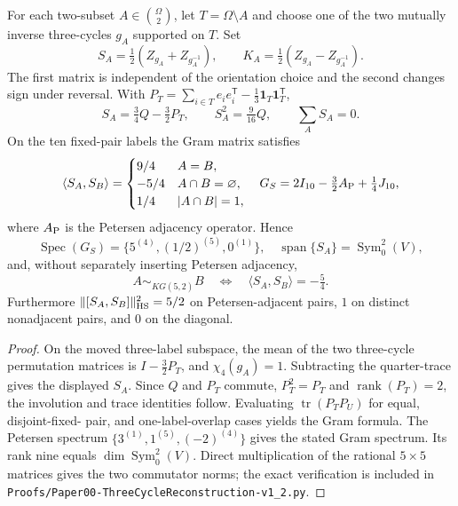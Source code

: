 \documentclass[11pt]{article}
\begin{document}
\begin{theorem}
\label{p1:thm:v342-three-cycle-petersen-overlap}
For each two-subset $A\in\binom\Omega2$, let $T=\Omega\setminus A$
and choose one of the two mutually inverse three-cycles $g_A$
supported on $T$.  Set
\[
 S_A=\tfrac12(Z_{g_A}+Z_{g_A^{-1}}),\qquad
 K_A=\tfrac12(Z_{g_A}-Z_{g_A^{-1}}).
\]
The first matrix is independent of the orientation choice and the
second changes sign under reversal.  With
$P_T=\sum_{i\in T}e_ie_i^{\mathsf T}
 -\tfrac13\mathbf1_T\mathbf1_T^{\mathsf T}$,
\[
 S_A=\tfrac34Q-\tfrac32P_T,\qquad
 S_A^2=\tfrac9{16}Q,\qquad
 \sum_AS_A=0.
\]
On the ten fixed-pair labels the Gram matrix satisfies
\[
 \langle S_A,S_B\rangle=
 \begin{cases}
 9/4&A=B,\\
 -5/4&A\cap B=\varnothing,\\
 1/4&|A\cap B|=1,
 \end{cases}
 \quad
 G_S=2I_{10}-\tfrac32A_{\rm P}+\tfrac14J_{10},
\]
where $A_{\rm P}$ is the Petersen adjacency operator.  Hence
\[
 \operatorname{Spec}(G_S)=\{5^{(4)},(1/2)^{(5)},0^{(1)}\},
 \quad \operatorname{span}\{S_A\}=\operatorname{Sym}^2_0(V),
\]
and, without separately inserting Petersen adjacency,
\[
 A\sim_{KG(5,2)}B\quad\Longleftrightarrow\quad
 \langle S_A,S_B\rangle=-\tfrac54.
\]
Furthermore
$\|[S_A,S_B]\|_{\rm HS}^2=5/2$ on Petersen-adjacent
pairs, $1$ on distinct nonadjacent pairs, and $0$ on the diagonal.
\end{theorem}
\begin{proof}
On the moved three-label subspace, the mean of the two three-cycle
permutation matrices is $I-\tfrac32P_T$, and
$\chi_4(g_A)=1$.  Subtracting the quarter-trace gives the displayed
$S_A$.  Since $Q$ and $P_T$ commute, $P_T^2=P_T$ and
$\operatorname{rank}(P_T)=2$, the involution and trace identities
follow.  Evaluating $\operatorname{tr}(P_TP_U)$ for equal, disjoint-fixed-
pair, and one-label-overlap cases yields the Gram formula.  The
Petersen spectrum $\{3^{(1)},1^{(5)},(-2)^{(4)}\}$ gives the
stated Gram spectrum.  Its rank nine equals
$\dim\operatorname{Sym}^2_0(V)$.  Direct multiplication of the
rational $5\times5$ matrices gives the two commutator norms;
the exact verification is included in
\texttt{Proofs/Paper00-ThreeCycleReconstruction-v1\_2.py}.
\end{proof}
\end{document}

